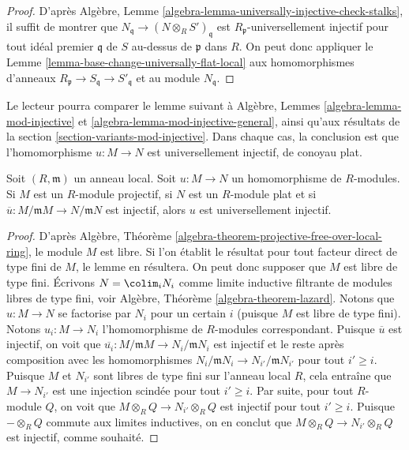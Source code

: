 \begin{proof}
D'après
Algèbre, Lemme \ref{algebra-lemma-universally-injective-check-stalks},
il suffit de montrer que $N_{\mathfrak q} \to (N \otimes_R S')_{\mathfrak q}$
est $R_{\mathfrak p}$-universellement injectif pour tout idéal premier $\mathfrak q$
de $S$ au-dessus de $\mathfrak p$ dans $R$. On peut donc appliquer
le Lemme \ref{lemma-base-change-universally-flat-local}
aux homomorphismes d'anneaux
$R_{\mathfrak p} \to S_{\mathfrak q} \to S'_{\mathfrak q}$
et au module $N_{\mathfrak q}$.
\end{proof}

\noindent
Le lecteur pourra comparer le lemme suivant à
Algèbre, Lemmes \ref{algebra-lemma-mod-injective} et
\ref{algebra-lemma-mod-injective-general}, ainsi qu'aux résultats de la
section \ref{section-variants-mod-injective}.
Dans chaque cas, la conclusion est que l'homomorphisme $u : M \to N$ est
universellement injectif, de conoyau plat.

\begin{lemma}
\label{lemma-universally-injective-local}
Soit $(R, \mathfrak m)$ un anneau local. Soit $u : M \to N$ un homomorphisme de $R$-modules.
Si $M$ est un $R$-module projectif, si $N$ est un $R$-module plat et si
$\overline{u} : M/\mathfrak mM \to N/\mathfrak mN$ est injectif,
alors $u$ est universellement injectif.
\end{lemma}

\begin{proof}
D'après
Algèbre, Théorème \ref{algebra-theorem-projective-free-over-local-ring},
le module $M$ est libre. Si l'on établit le résultat pour tout facteur direct de type
fini de $M$, le lemme en résultera. On peut donc
supposer que $M$ est libre de type fini. Écrivons $N = \colim_i N_i$ comme
limite inductive filtrante de modules libres de type fini, voir
Algèbre, Théorème \ref{algebra-theorem-lazard}.
Notons que $u : M \to N$ se factorise par $N_i$ pour un certain $i$ (puisque $M$ est libre
de type fini). Notons $u_i : M \to N_i$ l'homomorphisme de $R$-modules correspondant.
Puisque $\overline{u}$ est injectif, on voit que
$\overline{u_i} : M/\mathfrak mM \to N_i/\mathfrak mN_i$ est
injectif et le reste après composition avec les homomorphismes
$N_i/\mathfrak mN_i \to N_{i'}/\mathfrak mN_{i'}$ pour tout $i' \geq i$.
Puisque $M$ et $N_{i'}$ sont libres de type fini sur l'anneau local $R$, cela entraîne
que $M \to N_{i'}$ est une injection scindée pour tout $i' \geq i$. Par suite,
pour tout $R$-module $Q$, on voit que $M \otimes_R Q \to N_{i'} \otimes_R Q$
est injectif pour tout $i' \geq i$. Puisque $- \otimes_R Q$ commute aux
limites inductives, on en conclut que $M \otimes_R Q \to N_{i'} \otimes_R Q$
est injectif, comme souhaité.
\end{proof}

